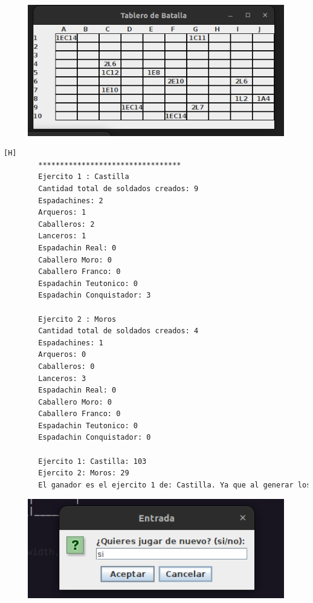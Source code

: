 \documentclass{article}
\begin{document}
	\begin{figure}[H]
		\centering
		\includegraphics[width=1.0\textwidth,keepaspectratio]{img/Commit13-2.png}
	\end{figure}
	\begin{lstlisting}[language=bash,caption={Ejecucion:}][H]
		*********************************
		Ejercito 1 : Castilla
		Cantidad total de soldados creados: 9
		Espadachines: 2
		Arqueros: 1
		Caballeros: 2
		Lanceros: 1
		Espadachin Real: 0
		Caballero Moro: 0
		Caballero Franco: 0
		Espadachin Teutonico: 0
		Espadachin Conquistador: 3
		
		Ejercito 2 : Moros
		Cantidad total de soldados creados: 4
		Espadachines: 1
		Arqueros: 0
		Caballeros: 0
		Lanceros: 3
		Espadachin Real: 0
		Caballero Moro: 0
		Caballero Franco: 0
		Espadachin Teutonico: 0
		Espadachin Conquistador: 0
		
		Ejercito 1: Castilla: 103
		Ejercito 2: Moros: 29
		El ganador es el ejercito 1 de: Castilla. Ya que al generar los porcentajes de probabilidad de victoria basada en los niveles de vida de sus soldados y aplicando un experimento aleatorio salió vencedor. (Aleatorio generado : 78.03)
	\end{lstlisting}
	\begin{figure}[H]
		\centering
		\includegraphics[width=1.0\textwidth,keepaspectratio]{img/Commit12-2.png}
	\end{figure}
\end{document}
